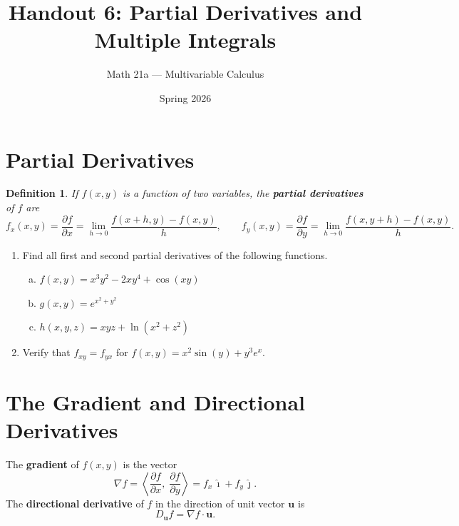 \documentclass[11pt]{article}
\title{Handout 6: Partial Derivatives and Multiple Integrals}
\author{Math 21a --- Multivariable Calculus}
\date{Spring 2026}
\newtheorem*{definition*}{Definition}
\begin{document}
\maketitle

\section*{Partial Derivatives}

\begin{definition*}
If $f(x, y)$ is a function of two variables, the \textbf{partial derivatives} of $f$ are
\[
  f_x(x,y) = \frac{\partial f}{\partial x} = \lim_{h \to 0} \frac{f(x+h, y) - f(x,y)}{h}, \qquad
  f_y(x,y) = \frac{\partial f}{\partial y} = \lim_{h \to 0} \frac{f(x, y+h) - f(x,y)}{h}.
\]
\end{definition*}

\begin{enumerate}
\item Find all first and second partial derivatives of the following functions.
\begin{enumerate}[(a)]
  \item $f(x, y) = x^3 y^2 - 2xy^4 + \cos(xy)$

  \item $g(x, y) = e^{x^2 + y^2}$

  \item $h(x, y, z) = xyz + \ln(x^2 + z^2)$
\end{enumerate}

\item Verify that $f_{xy} = f_{yx}$ for $f(x, y) = x^2 \sin(y) + y^3 e^x$.
\end{enumerate}

\section*{The Gradient and Directional Derivatives}

The \textbf{gradient} of $f(x,y)$ is the vector
\[
  \nabla f = \left\langle \frac{\partial f}{\partial x}, \; \frac{\partial f}{\partial y} \right\rangle = f_x \, \bm{\hat{\imath}} + f_y \, \bm{\hat{\jmath}}.
\]
The \textbf{directional derivative} of $f$ in the direction of unit vector $\bm{u}$ is
\[
  D_{\bm{u}} f = \nabla f \cdot \bm{u}.
\]
\end{document}
